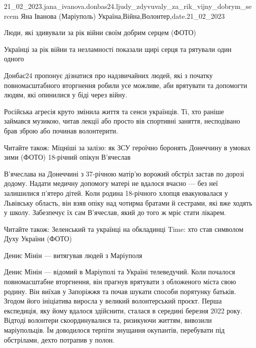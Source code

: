  
 
 
 
 

21_02_2023.jana_ivanova.donbas24.ljudy_zdyvuvaly_za_rik_vijny_dobrym_sercem
Яна Іванова (Маріуполь)
Україна,Війна,Волонтер,date.21_02_2023

Люди, які здивували за рік війни своїм добрим серцем (ФОТО)

Українці за рік війни та незламності показали щирі серця та рятували один
одного

Донбас24 пропонує дізнатися про надзвичайних людей, які з початку
повномасштабного вторгнення робили усе можливе, аби врятувати та допомогти
людям, які опинилися у біді через війну.

Російська агресія круто змінила життя та сенси українців. Ті, хто раніше
займався музикою, читав лекції або просто вів спортивні заняття, несподівано
брав зброю або починав волонтерити.

Читайте також: Міцніші за залізо: як ЗСУ героїчно боронять Донеччину в умовах
зими (ФОТО) 18-річний опікун В'ячеслав

В'ячеслава на Донеччині з 37-річною матір'ю ворожий обстріл застав по дорозі
додому. Надати медичну допомогу матері не вдалося вчасно — без неї залишилися
п'ятеро дітей. Коли родина 18-річного хлопця евакуювалася у Львівську область,
він взяв опіку над чотирма братами й сестрами, які вже ходять у школу.
Забезпечує їх сам В'ячеслав, який до того ж мріє стати лікарем.

Читайте також: Зеленський та українці на обкладинці Time: хто став символом
Духу України (ФОТО)

Денис Мінін — витягував людей з Маріуполя

Денис Мінін — відомий в Маріуполі та Україні телеведучий. Коли почалося
повномасштабне вторгнення, він прагнув врятувати з обложеного міста свою
родину. Він виїхав у Запоріжжя та почав шукати способи порятунку батьків.
Згодом його ініціатива виросла у великий волонтерський проєкт. Перша
експедиція, яку йому вдалося здійснити, сталася в середині березня 2022 року.
Відтоді волонтери скоординувалися та, ризикуючи життям, вивозили маріупольців.
Їм доводилося терпіти знущання окупантів, перебувати під обстрілами, дехто
потрапив у полон.


